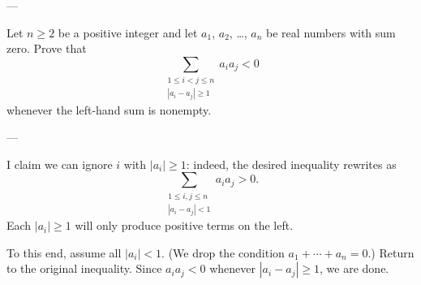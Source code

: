 
---

Let $n\ge2$ be a positive integer and let $a_1$, $a_2$, \ldots, $a_n$ be real numbers with sum zero. Prove that
\[\sum_{\substack{1\le i<j\le n\\ |a_i-a_j|\ge1}}a_ia_j<0\]
whenever the left-hand sum is nonempty.

---

I claim we can ignore $i$ with $|a_i|\ge1$: indeed, the desired inequality rewrites as
\[\sum_{\substack{1\le i,j\le n\\ |a_i-a_j|<1}}a_ia_j>0.\]
Each $|a_i|\ge1$ will only produce positive terms on the left.


To this end, assume all $|a_i|<1$. (We drop the condition $a_1+\cdots+a_n=0$.) Return to the original inequality. Since $a_ia_j<0$ whenever $|a_i-a_j|\ge1$, we are done.
